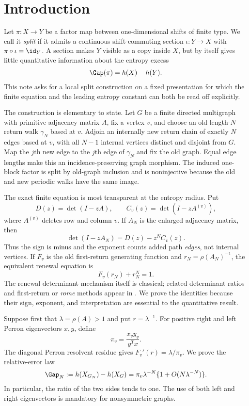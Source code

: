 \section{Introduction}
\label{sec:introduction}

Let $\pi:X\to Y$ be a factor map between one-dimensional shifts of finite
type.  We call it \emph{split} if it admits a continuous shift-commuting
section $\iota:Y\to X$ with $\pi\circ\iota=\id_Y$.  A section makes $Y$
visible as a copy inside $X$, but by itself gives little quantitative
information about the entropy excess
\[
 \Gap(\pi)=h(X)-h(Y).
\]
This note asks for a local split construction on a fixed presentation for
which the finite equation and the leading entropy constant can both be read
off explicitly.

The construction is elementary to state.  Let $G$ be a finite directed
multigraph with primitive adjacency matrix $A$, fix a vertex $v$, and choose
an old length-$N$ return walk $\gamma_N$ based at $v$.  Adjoin an internally
new return chain of exactly $N$ edges based at $v$, with all $N-1$ internal
vertices distinct and disjoint from $G$.  Map the $j$th new edge to the $j$th edge of
$\gamma_N$ and fix the old graph.  Equal edge lengths make this an
incidence-preserving graph morphism.  The induced one-block factor is split
by old-graph inclusion and is noninjective because the old and new periodic
walks have the same image.

The exact finite equation is most transparent at the entropy radius.  Put
\[
 D(z)=\det(I-zA),\qquad
 C_v(z)=\det(I-zA^{(v)}),
\]
where $A^{(v)}$ deletes row and column $v$.  If $A_N$ is the enlarged
adjacency matrix, then
\begin{equation}
 \det(I-zA_N)=D(z)-z^NC_v(z).
 \label{eq:intro-determinant}
\end{equation}
Thus the sign is minus and the exponent counts added path \emph{edges}, not
internal vertices.  If $F_v$ is the old first-return generating function and
$r_N=\rho(A_N)^{-1}$, the equivalent renewal equation is
\begin{equation}
 F_v(r_N)+r_N^N=1.
 \label{eq:intro-renewal}
\end{equation}
The renewal determinant mechanism itself is classical; related determinant
ratios and first-return or \emph{rome} methods appear in
\cite{Gomez2010,BlockEtAl1980}.  We prove the identities because their sign,
exponent, and interpretation are essential to the quantitative result.

Suppose first that $\lambda=\rho(A)>1$ and put $r=\lambda^{-1}$.  For
positive right and left Perron eigenvectors $x,y$, define
\begin{equation}
 \pi_v=\frac{x_vy_v}{y^Tx}.
 \label{eq:intro-pi}
\end{equation}
The diagonal Perron resolvent residue gives
$F_v'(r)=\lambda/\pi_v$.  We prove the relative-error law
\begin{equation}
 \Gap_N:=h(X_{G_N})-h(X_G)
 =\pi_v\lambda^{-N}\{1+O(N\lambda^{-N})\}.
 \label{eq:intro-positive-law}
\end{equation}
In particular, the ratio of the two sides tends to one.  The use of both
left and right eigenvectors is mandatory for nonsymmetric graphs.


